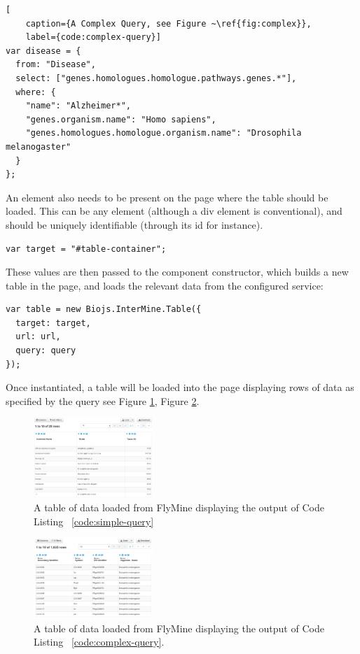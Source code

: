 \documentclass[10pt,a4paper,twocolumn]{article}
\begin{document}
\begin{lstlisting}[
    caption={A Complex Query, see Figure ~\ref{fig:complex}},
    label={code:complex-query}]
var disease = {
  from: "Disease",
  select: ["genes.homologues.homologue.pathways.genes.*"],
  where: {
    "name": "Alzheimer*",
    "genes.organism.name": "Homo sapiens",
    "genes.homologues.homologue.organism.name": "Drosophila melanogaster"
  }
};
\end{lstlisting}

An element also needs to be present on the page where the table should be
loaded. This can be any element (although a div element is 
conventional), and should be uniquely identifiable (through its id for instance).

\begin{lstlisting}[caption={Defining the Target Element}, label={code:target-el}]
var target = "#table-container";
\end{lstlisting}

These values are then passed to the component constructor, which builds
a new table in the page, and loads the relevant data from the configured service:

\begin{lstlisting}[caption={Instantiation}, label={code:instantiation}]
var table = new Biojs.InterMine.Table({
  target: target,
  url: url,
  query: query
});
\end{lstlisting}

Once instantiated, a table will be loaded into the page displaying rows of data
as specified by the query see Figure \ref{fig:1}, Figure \ref{fig:complex}.

\begin{figure}
\centering
\includegraphics[width=0.4\textwidth]{imtable.png}
\caption{
    \label{fig:1}
    A table of data loaded from FlyMine displaying the output
   of Code Listing ~\ref{code:simple-query}
}
\end{figure}

\begin{figure}
\centering
\includegraphics[width=0.4\textwidth]{imtable-complex.png}
\caption{
    \label{fig:complex}
    A table of data loaded from FlyMine displaying the output of Code Listing
    ~\ref{code:complex-query}.
}
\end{figure}
\end{document}
